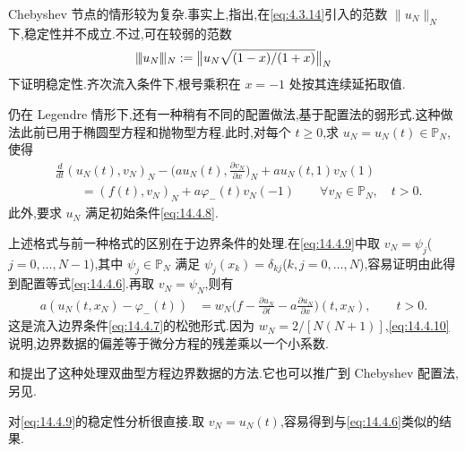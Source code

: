 Chebyshev 节点的情形较为复杂.事实上,指出,在\eqref{eq:4.3.14}引入的范数 \(\|u_N\|_N\) 下,稳定性并不成立.不过,可在较弱的范数
\[
  \lVert\!\lvert u_N\rvert\!\rVert_N:=\bigl\|u_N\sqrt{(1-x)/(1+x)}\bigr\|_N
\]
下证明稳定性.齐次流入条件下,根号乘积在 \(x=-1\) 处按其连续延拓取值.

仍在 Legendre 情形下,还有一种稍有不同的配置做法,基于配置法的弱形式.这种做法此前已用于椭圆型方程和抛物型方程.此时,对每个 \(t\ge0\),求 \(u_N=u_N(t)\in\mathbb P_N\),使得
\begin{equation}\label{eq:14.4.9}
  \begin{aligned}
    &\frac{d}{dt}(u_N(t),v_N)_N-\biggl(au_N(t),\frac{\partial v_N}{\partial x}\biggr)_N
          +au_N(t,1)v_N(1)\\
    &\qquad=(f(t),v_N)_N+a\varphi_-(t)v_N(-1)
          \qquad\forall v_N\in\mathbb P_N,\quad t>0.
  \end{aligned}
\end{equation}
此外,要求 \(u_N\) 满足初始条件\eqref{eq:14.4.8}.

上述格式与前一种格式的区别在于边界条件的处理.在\eqref{eq:14.4.9}中取 \(v_N=\psi_j\)(\(j=0,\ldots,N-1\)),其中 \(\psi_j\in\mathbb P_N\) 满足 \(\psi_j(x_k)=\delta_{kj}\)(\(k,j=0,\ldots,N\)),容易证明由此得到配置等式\eqref{eq:14.4.6}.再取 \(v_N=\psi_N\),则有
\begin{equation}\label{eq:14.4.10}
  \begin{aligned}
    a(u_N(t,x_N)-\varphi_-(t))
      &=w_N\biggl(f-\frac{\partial u_N}{\partial t}
                         -a\frac{\partial u_N}{\partial x}\biggr)(t,x_N),
         \qquad t>0.
  \end{aligned}
\end{equation}
这是流入边界条件\eqref{eq:14.4.7}的松弛形式.因为 \(w_N=2/[N(N+1)]\),\eqref{eq:14.4.10}说明,边界数据的偏差等于微分方程的残差乘以一个小系数.

和提出了这种处理双曲型方程边界数据的方法.它也可以推广到 Chebyshev 配置法,另见.

对\eqref{eq:14.4.9}的稳定性分析很直接.取 \(v_N=u_N(t)\),容易得到与\eqref{eq:14.4.6}类似的结果.

